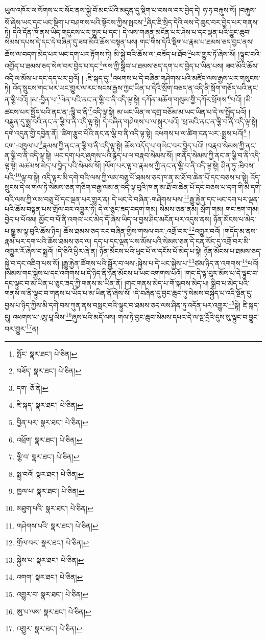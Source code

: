 ཡུལ་འཁོར་ལ་སོགས་པར་སོང་ནས་སྐྱེ་བོ་མང་པོའི་མདུན་དུ་སྡིག་པ་བསལ་བར་བྱེད་དེ། ཧ་ཧ་བརྐུས་སོ། །བརྐུས་སོ་ཞེས་ཡང་དང་ཡང་སྡིག་པ་བཤགས་པའི་སྟོབས་ཀྱིས་སྤངས་\footnote{སྤོང་  སྣར་ཐང་།  པེ་ཅིན། }ཞིང་ཇི་སྲིད་དེའི་ལས་དེ་ཆུང་བར་བྱེད་པར་གནས་ཏེ། དེའི་དོན་ཁོ་ནས་ཡིད་གདུངས་པར་གྱུར་པ་དང་། དེ་ལས་གཞན་མངོན་པར་ཤེས་པ་དང་ལྡན་པའི་བྱུང་ཆུབ་སེམས་དཔས་དེ་དང་དེ་བཞིན་དུ་ཟབ་མོའི་ཆོས་བསྟན་པས། གང་གིས་དེའི་སྡིག་པ་རྣམ་པ་ཐམས་ཅད་བྱང་ནས་ཆོས་ལ་བདག་མེད་པར་ཡང་དག་པར་རྟོགས་ཏེ། མི་སྐྱེ་བའི་ཆོས་ལ་:བཟོད་པ་ཐོབ་\footnote{བཟོད་  སྣར་ཐང་།  པེ་ཅིན། }པར་གྱུར་ཏོ་ཞེས་སོ། །ལྟུང་བའི་འགྱོད་པ་ཐམས་ཅད་སེལ་བར་བྱེད་པ་དང་\footnote{དག་  ཅོ་ནེ། }ལས་ཀྱི་སྒྲིབ་པ་ཐམས་ཅད་དག་པར་བྱེད་པ་ཡིན་པས། ཟབ་མོའི་ཆོས་འདི་ལ་མོས་པ་དང་དད་པར་བྱའོ། །
:ཇི་སྐད་དུ་\footnote{ཇི་སྐད་  སྣར་ཐང་།  པེ་ཅིན། }འཕགས་པ་དེ་བཞིན་གཤེགས་པའི་མཛོད་ལས་རྒྱས་པར་གསུངས་ཏེ། འོད་སྲུངས་གང་ཕར་ཡང་གྱུར་ལ་རང་སངས་རྒྱས་ཀྱང་ཡིན་པ་དེའི་སྲོག་བཅད་ན་འདི་ནི་སྲོག་གཅོད་པའི་ནང་ན་ལྕི་བའོ། །མ་:བྱིན་པ་\footnote{བྱིན་པར་  སྣར་ཐང་།  པེ་ཅིན། }ལེན་པའི་ནང་ན་ལྕི་བ་ནི་འདི་ལྟ་སྟེ། དཀོན་མཆོག་གསུམ་གྱི་དཀོར་ཕྲོགས་\footnote{འཕྲོག་  སྣར་ཐང་།  པེ་ཅིན། }པའོ། །མི་ཚངས་པར་སྤྱོད་པའི་ནང་ན་:ལྕི་བ་ནི་\footnote{ལྕི་བ་  སྣར་ཐང་།  པེ་ཅིན། }འདི་ལྟ་སྟེ། མ་ཡང་ཡིན་ལ་དགྲ་བཅོམ་མ་ཡང་ཡིན་པ་དེ་ལ་སྤྱོད་པའོ། །བརྫུན་དུ་སྨྲ་བའི་ནང་ན་ལྕི་བ་ནི་འདི་ལྟ་སྟེ། དེ་བཞིན་གཤེགས་པ་ལ་སྐུར་པའོ། །ཕྲ་མའི་ནང་ན་ལྕི་བ་ནི་འདི་ལྟ་སྟེ། དགེ་འདུན་གྱི་དབྱེན་ནོ། །ཚིག་རྩུབ་པོའི་ནང་ན་ལྕི་བ་ནི་འདི་ལྟ་སྟེ། འཕགས་པ་ལ་ཚིག་ངན་པར་:སྨྲས་པའོ།\footnote{སྨྲ་བའོ།  སྣར་ཐང་།  པེ་ཅིན། } །ངག་:འཁྱལ་པ་\footnote{ཁྱལ་པ་  སྣར་ཐང་།  པེ་ཅིན། }རྣམས་ཀྱི་ནང་ན་ལྕི་བ་ནི་འདི་ལྟ་སྟེ། ཆོས་འདོད་པ་གཡེང་བར་བྱེད་པའོ། །བརྣབ་སེམས་ཀྱི་ནང་ན་ལྕི་བ་ནི་འདི་ལྟ་སྟེ། ཡང་དག་པར་ཞུགས་པའི་རྙེད་པ་ལ་བརྣབ་སེམས་སོ། །གནོད་སེམས་ཀྱི་ནང་ན་ལྕི་བ་ནི་འདི་ལྟ་སྟེ། མཚམས་མེད་པ་བྱེད་པའི་སེམས་སོ། །ལོག་པར་ལྟ་བ་རྣམས་ཀྱི་ནང་ན་ལྕི་བ་ནི་འདི་ལྟ་སྟེ། ཤིན་ཏུ་:ཐིབས་པའི་\footnote{མཐུག་པའི་  སྣར་ཐང་།  པེ་ཅིན། }ལྟ་བ་སྟེ། འདི་ལྟར་མི་དགེ་བའི་ལས་ཀྱི་ལམ་བཅུ་པོ་ཐམས་ཅད་ཁ་ན་མ་ཐོ་བ་ཆེན་པོ་དང་བཅས་པ་སྟེ། འོད་སྲུངས་དེ་ལ་གལ་ཏེ་སེམས་ཅན་གཅིག་བརྒྱ་ལམ་ན་འདི་ལྟ་བུའི་ཁ་ན་མ་ཐོ་བ་ཆེན་པོ་དང་བཅས་པ་དག་གི་མི་དགེ་བའི་ལས་ཀྱི་ལམ་བཅུ་པོ་དང་ལྡན་པར་གྱུར་ན། དེ་ཡང་དེ་བཞིན་:གཤེགས་པས་\footnote{གཤེགས་པའི་  སྣར་ཐང་།  པེ་ཅིན། }རྒྱུ་རྐྱེན་དང་ཡང་དག་པར་ལྡན་པའི་ཆོས་བསྟན་པས་གྲོལ་བར་འགྱུར་ཏེ། དེ་ལ་ཅུང་ཟད་བདག་གམ། སེམས་ཅན་ནམ། སྲོག་གམ། གང་ཟག་གམ། བྱེད་པ་པོའམ། མྱོང་བ་པོ་ནི་འགའ་ཡང་མེད་དོ་ཞེས་ཡིད་ལ་བྱས་ཤིང་མངོན་པར་འདུས་ནས། ཉོན་མོངས་པ་མེད་པ་སྒྱུ་མ་ལྟ་བུའི་ཆོས་ཉིད། ཆོས་ཐམས་ཅད་རང་བཞིན་གྱིས་གསལ་བར་:འགྲོ་བར་\footnote{གྲོལ་བར་  སྣར་ཐང་།  པེ་ཅིན། }འགྱུར་བའོ། །གདོད་མ་ནས་རྣམ་པར་དག་པའི་ཆོས་ཐམས་ཅད་ལ། དད་པ་དང་ལྡན་པས་མོས་པའི་སེམས་ཅན་དེ་ངན་སོང་དུ་འགྲོ་བར་མི་འགྱུར་རོ་ཞེས་ང་སྨྲའོ། །དེ་ཅིའི་ཕྱིར་ཞེ་ན། ཉོན་མོངས་པའི་ཕུང་པོ་ལ་དངོས་པོ་མེད་པ་སྟེ། ཉོན་མོངས་པ་ཐམས་ཅད་སྐྱེ་བ་དང་འཇིག་པས་སོ། །རྒྱུ་རྐྱེན་ཚོགས་པའི་སྦྱོར་བ་ལས་:སྐྱེས་པ་དེ་ཡང་སྐྱེས་པ་\footnote{སྐྱེས་པ་  སྣར་ཐང་།  པེ་ཅིན། }ཙམ་ཉིད་ན་འགགས་\footnote{འགག་  སྣར་ཐང་།  པེ་ཅིན། }པའོ། །སེམས་གང་སྐྱེས་པ་དང་འགགས་པ་དེ་ཉིད་ནི་ཉོན་མོངས་པ་ཡང་འགགས་པའོ། །གང་དེ་ལྟ་བུར་མོས་པ་དེ་ལྟུང་བ་དང་ལྟུང་བ་མ་ཡིན་པ་ཅུང་ཟད་ཀྱི་གནས་མ་ཡིན་ནོ། །གང་གནས་མེད་པ་གོ་སྐབས་མེད་པ། སྒྲིབ་པ་མེད་པའི་གནས་ལ་ནི་ལྟུང་བ་གནས་པ་ཡོད་པ་མ་ཡིན་ནོ་ཞེས་སོ། །དེ་བཞིན་དུ་བྱང་ཆུབ་ཏུ་སེམས་བསྐྱེད་པ་འདི་སྔོན་དུ་བྱས་པ་ཉིད་ཀྱིས་མི་དགེ་བས་ཀུན་ནས་བསླང་བའི་ལྟུང་བ་ཐམས་ཅད་ལས་ཤིན་ཏུ་འདོན་པར་འགྱུར་\footnote{འགྱུར་བ་  སྣར་ཐང་།  པེ་ཅིན། }སྟེ། ཇི་སྐད་དུ། འཕགས་པ་:ཨུ་པཱ་ལིས་\footnote{ཨུ་པ་ལས་  སྣར་ཐང་།  པེ་ཅིན། }ཞུས་པའི་མདོ་ལས། གལ་ཏེ་བྱང་ཆུབ་སེམས་དཔའ་དེ་ལ་སྔ་དྲོའི་དུས་སུ་ལྟུང་བ་བྱུང་བར་གྱུར་\footnote{འགྱུར་  སྣར་ཐང་།  པེ་ཅིན། }ན། 